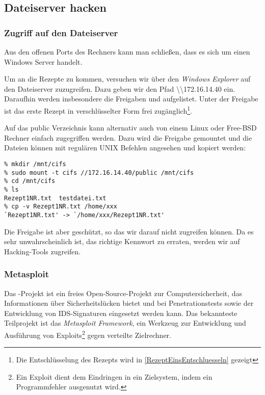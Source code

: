 \subsection{Dateiserver hacken}
\label{sec:dateiserverhacken}

\subsubsection{Zugriff auf den Dateiserver}

Aus den offenen Ports des Rechners  kann man
schließen, dass es sich um einen Windows Server handelt.

Um an die Rezepte zu kommen, versuchen wir über den \emph{Windows Explorer} auf
den Dateiserver zuzugreifen.  Dazu geben wir den Pfad
\textbackslash\textbackslash172.16.14.40 ein. Daraufhin werden insbesondere die
Freigaben  und  aufgelistet. Unter der Freigabe
 ist das erste Rezept in verschlüsselter Form frei
zugänglich\footnote{Die Entschlüsselung des Rezepts wird in
  \cref{RezeptEinsEntschluesseln} gezeigt}.

Auf das public Verzeichnis kann alternativ auch von einem Linux oder Free-BSD
Rechner einfach zugegriffen werden. Dazu wird die Freigabe
\glqq{}gemountet\grqq{} und die Dateien können mit regulären UNIX Befehlen
angesehen und kopiert werden:

\begin{lstlisting}
% mkdir /mnt/cifs
% sudo mount -t cifs //172.16.14.40/public /mnt/cifs
% cd /mnt/cifs
% ls
Rezept1NR.txt  testdatei.txt
% cp -v Rezept1NR.txt /home/xxx
`Rezept1NR.txt' -> `/home/xxx/Rezept1NR.txt'
\end{lstlisting}

 Die Freigabe  ist aber geschützt, so das wir darauf nicht
 zugreifen können. Da es sehr unwahrscheinlich ist, das richtige Kennwort zu
 erraten, werden wir auf Hacking-Tools zugreifen.

\subsubsection{Metasploit}

Das \Metasploit{}-Projekt ist ein freies Open-Source-Projekt zur
Computersicherheit, das Informationen über Sicherheitslücken bietet und bei
Penetrationstests sowie der Entwicklung von IDS-Signaturen eingesetzt werden
kann. Das bekannteste Teilprojekt ist das \emph{Metasploit Framework}, ein
Werkzeug zur Entwicklung und Ausführung von Exploits\footnote{Ein Exploit dient
  dem Eindringen in ein Zielsystem, indem ein Programmfehler ausgenutzt wird.}
gegen verteilte Zielrechner.

